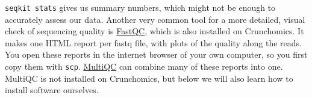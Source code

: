 \documentclass[
  letterpaper,
  DIV=11,
  numbers=noendperiod]{scrreprt}
\begin{document}
\begin{tcolorbox}[enhanced jigsaw, colbacktitle=quarto-callout-tip-color!10!white, rightrule=.15mm, leftrule=.75mm, colback=white, opacitybacktitle=0.6, title=\textcolor{quarto-callout-tip-color}{\faLightbulb}\hspace{0.5em}{Tip: FastQC for visual quality reports (optional)}, bottomrule=.15mm, left=2mm, colframe=quarto-callout-tip-color-frame, opacityback=0, breakable, bottomtitle=1mm, coltitle=black, arc=.35mm, toprule=.15mm, toptitle=1mm, titlerule=0mm]

\texttt{seqkit\ stats} gives us summary numbers, which might not be
enough to accurately assess our data. Another very common tool for a
more detailed, visual check of sequencing quality is
\href{https://www.bioinformatics.babraham.ac.uk/projects/fastqc/}{FastQC},
which is also installed on Crunchomics. It makes one HTML report per
fastq file, with plots of the quality along the reads. You open these
reports in the internet browser of your own computer, so you first copy
them with \texttt{scp}. \href{https://seqera.io/multiqc/}{MultiQC} can
combine many of these reports into one. MultiQC is not installed on
Crunchomics, but below we will also learn how to install software
ourselves.

\end{tcolorbox}
\end{document}
